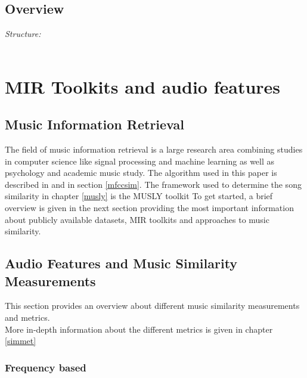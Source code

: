 \section{Overview}

\textit{Structure: \\}
\ \\
\begin{figure}[htbp]
	\centering
\end{figure}

\chapter{MIR Toolkits and audio features}

\section{Music Information Retrieval}
The field of music information retrieval is a large research area combining studies in computer science like signal processing and machine learning as well as psychology and academic music study.
The algorithm used in this paper is described in \cite[pp. 17ff]{schnitzer1} and in section \ref{mfccsim}.
The framework used to determine the song similarity in chapter \ref{musly} is the MUSLY toolkit \cite{musly1}
To get started, a brief overview is given in the next section providing the most important information about publicly available datasets, MIR toolkits and approaches to music similarity.

\section{Audio Features and Music Similarity Measurements}

This section provides an overview about different music similarity measurements and metrics.\\
More in-depth information about the different metrics is given in chapter \ref{simmet}

\subsection{Frequency based}\label{featsec}

